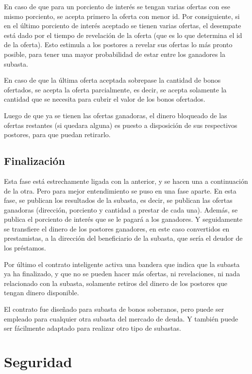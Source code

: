       En caso de que para un porciento de interés se tengan varias ofertas con ese mismo porciento, se acepta primero la oferta con menor 
      id. Por consiguiente, si en el último porciento de interés aceptado se tienen varias ofertas, el desempate está dado por el tiempo
      de revelación de la oferta (que es lo que determina el id de la oferta). Esto estimula a los postores a revelar sus ofertas lo más
      pronto posible, para tener una mayor probabilidad de estar entre los ganadores la subasta.

      En caso de que la última oferta aceptada sobrepase la cantidad de bonos ofertados, se acepta la oferta parcialmente, es decir, se
      acepta solamente la cantidad que se necesita para cubrir el valor de los bonos ofertados.

      Luego de que ya se tienen las ofertas ganadoras, el dinero bloqueado de las ofertas restantes (si quedara alguna) es puesto a 
      disposición de sus respectivos postores, para que puedan retirarlo.

      \subsection{Finalización}
      Esta fase está estrechamente ligada con la anterior, y se hacen una a continuación de la otra. Pero para mejor entendimiento se 
      puso en una fase aparte. En esta fase, se publican los resultados de la subasta, es decir, se publican las ofertas ganadoras
      (dirección, porciento y cantidad a prestar de cada una). Además, se publica el porciento de interés que se le pagará a los ganadores.
      Y seguidamente se transfiere el dinero de los postores ganadores, en este caso convertidos en prestamistas, a la dirección del 
      beneficiario de la subasta, que sería el deudor de los préstamos.

      Por último el contrato inteligente activa una bandera que indica que la subasta ya ha finalizado, y que no se pueden hacer más
      ofertas, ni revelaciones, ni nada relacionado con la subasta, solamente retiros del dinero de los postores que tengan dinero disponible.

      El contrato fue diseñado para subasta de bonos soberanos, pero puede ser empleado para cualquier otra subasta del mercado de deuda.
      Y también puede ser fácilmente adaptado para realizar otro tipo de subastas.

  \section{Seguridad}
